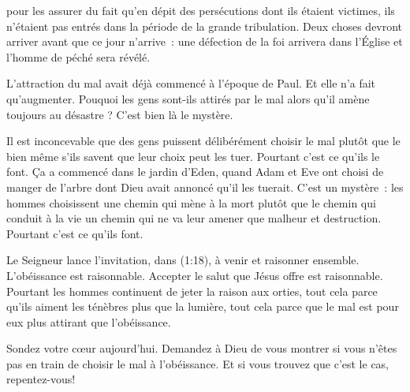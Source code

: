 



 pour les assurer du fait
 qu'en dépit des persécutions dont ils étaient victimes,
 ils n'étaient pas entrés dans la période de la grande tribulation.
 Deux choses devront arriver avant que ce jour n'arrive~:
 une défection de la foi arrivera dans l'Église 
 et l'homme de péché sera révélé.

L'attraction du mal avait déjà commencé à l'époque de Paul.
 Et elle n'a fait qu'augmenter. Pouquoi les gens sont-ils attirés
 par le mal alors qu'il amène toujours au désastre ?
 C'est bien là le mystère.


Il est inconcevable que des gens puissent délibérément choisir le mal
 plutôt que le bien \ocadr même s'ils savent que leur choix peut les tuer.
 Pourtant c'est ce qu'ils le font.
 Ça a commencé dans le jardin d'Eden, quand Adam et Eve ont choisi de manger
 de l'arbre dont Dieu avait annoncé qu'il les tuerait.
 C'est un mystère~: les hommes choisissent une chemin qui mène à la mort
 plutôt que le chemin qui conduit à la vie
 \ocadr un chemin qui ne va leur amener que malheur et destruction.
 Pourtant c'est ce qu'ils font.

Le Seigneur lance l'invitation, dans (1:18),
 à \og venir et raisonner ensemble. \fg{} L'obéissance est raisonnable.
 Accepter le salut que Jésus offre est raisonnable.
 Pourtant les hommes continuent  de jeter la raison aux orties,
 tout cela parce qu'ils aiment les ténèbres plus que la lumière,
 tout cela parce que le mal est pour eux plus attirant que l'obéissance.

Sondez votre cœur aujourd'hui. Demandez à Dieu de vous montrer
 si vous n'êtes pas en train de choisir le mal à l'obéissance.
 Et si vous trouvez que c'est le cas, repentez-vous!

\dvrule



